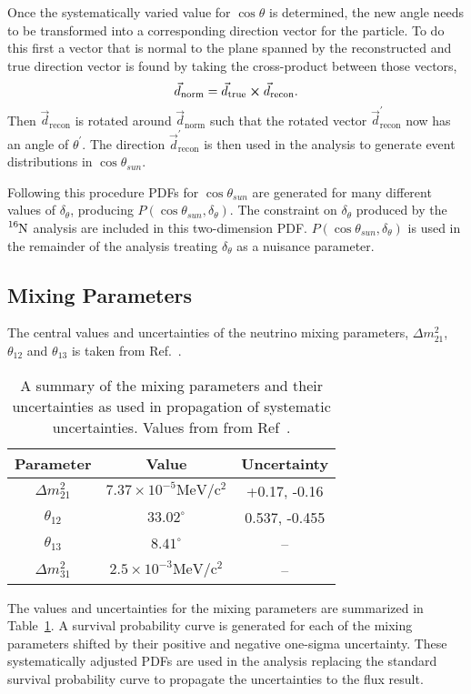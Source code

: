 Once the systematically varied value for $\cos\theta$ is determined, the new angle
needs to be transformed into a corresponding direction vector for the particle.
To do this first a vector that is normal to the plane spanned by the reconstructed
and true direction vector is found by taking the cross-product between those vectors,
\begin{equation}
    \vec{d}_{\mathrm{norm}} = \vec{d}_{\mathrm{true}} \cross \vec{d}_{\mathrm{recon}}\text{.}
\end{equation}
Then $\vec{d}_{\mathrm{recon}}$ is rotated around $\vec{d}_{\mathrm{norm}}$
such that the rotated vector $\vec{d}^{\prime}_{\mathrm{recon}}$ now has an angle
of $\theta^{\prime}$.
The direction $\vec{d}^{\prime}_{\mathrm{recon}}$ is then used in the
analysis to generate event distributions in $\cos\theta_{sun}$.

Following this procedure PDFs for $\cos\theta_{sun}$ are generated for many different
values of $\delta_{\theta}$, producing $P(\cos\theta_{sun}, \delta_{\theta})$.
The constraint on $\delta_{\theta}$ produced by the $\ce{^{16}N}$ analysis
are included in this two-dimension PDF\@.
$P(\cos\theta_{sun}, \delta_{\theta})$ is used in the remainder of the analysis
treating $\delta_{\theta}$ as a nuisance parameter.

\subsection{Mixing Parameters}
The central values and uncertainties of the neutrino mixing parameters, $\Delta
m^{2}_{21}$, $\theta_{12}$ and $\theta_{13}$ is taken from Ref.~\citep{pdg_globalfit}.
\begin{table}
    \centering
    \begin{tabular}{c | c | c}
        Parameter & Value & Uncertainty\\
        \hline
        $\Delta m^{2}_{21}$ & $7.37\times10^{-5} \mathrm{MeV}/\mathrm{c}^{2}$ & +0.17, -0.16\\
        $\theta_{12}$ & $33.02^{\circ}$ & 0.537, -0.455 \\
        $\theta_{13}$ & $8.41^{\circ}$ & -- \\
        $\Delta m^{2}_{31}$ & $2.5\times10^{-3}\mathrm{MeV}/\mathrm{c}^{2}$ & -- \\
    \end{tabular}
    \caption{A summary of the mixing parameters and their uncertainties as used in 
    propagation of systematic uncertainties. Values from from Ref~\citep{pdg_globalfit}.}
\label{tbl:mixing_values}
\end{table}
The values and uncertainties for the mixing parameters
are summarized in Table~\ref{tbl:mixing_values}.
A survival probability curve is generated for each of the mixing parameters
shifted by their positive and negative one-sigma uncertainty.
These systematically adjusted PDFs are used in the analysis replacing the
standard survival probability curve to propagate the uncertainties to the
flux result.
